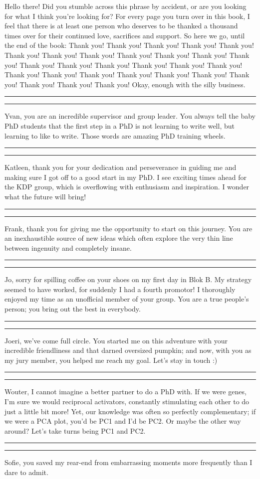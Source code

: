 Hello there! Did you stumble across this phrase by accident, 
or are you looking for what I think you're looking for?
For every page you turn over in this book,
I feel that there is at least one person who deserves to be thanked 
a thousand times over for their continued love, sacrifices and support.
So here we go, until the end of the book: Thank you! Thank you!
Thank you! Thank you! Thank you! Thank you! Thank you! Thank you! 
Thank you! Thank you! Thank you! Thank you! Thank you! Thank you!
Thank you! Thank you! Thank you! Thank you! Thank you! Thank you!
Thank you! Thank you! Thank you! Thank you! Thank you! Thank you!
Thank you! Thank you! Okay, enough with the silly business.
\rule{10cm}{0.4pt}
\rule{10cm}{0.4pt}
Yvan, you are an incredible supervisor and group leader. 
You always tell the baby PhD students that the first step in a PhD
is not learning to write well, but learning to like to write.
Those words are amazing PhD training wheels.
\rule{10cm}{0.4pt}
\rule{10cm}{0.4pt}
Katleen, thank you for your dedication and perseverance
in guiding me and making sure I got off to a good start in my PhD.
I see exciting times ahead for the KDP group, which is overflowing
with enthusiasm and inspiration. I wonder what the future will bring!
\rule{10cm}{0.4pt}
\rule{10cm}{0.4pt}
Frank, thank you for giving me the opportunity to start on this journey.
You are an inexhaustible source of new ideas
which often explore the very thin line
between ingenuity and completely insane.
\rule{10cm}{0.4pt}
\rule{10cm}{0.4pt}
Jo, sorry for spilling coffee on your shoes on my first day in Blok B.
My strategy seemed to have worked, for suddenly I had a fourth promotor!
I thoroughly enjoyed my time as an unofficial member of your group.
You are a true people's person; you bring out the best in everybody.
\rule{10cm}{0.4pt}
\rule{10cm}{0.4pt}
Joeri, we've come full circle. You started me on this adventure
with your incredible friendliness and that darned oversized pumpkin;
and now, with you as my jury member, you helped me reach my goal.
Let's stay in touch :)
\rule{10cm}{0.4pt}
\rule{10cm}{0.4pt}
Wouter, I cannot imagine a better partner to do a PhD with.
If we were genes, I'm sure we would reciprocal activators,
constantly stimulating each other to do just a little bit more!
Yet, our knowledge was often so perfectly complementary;
if we were a PCA plot, you'd be PC1 and I'd be PC2.
Or maybe the other way around? Let's take turns being PC1 and PC2.
\rule{10cm}{0.4pt}
\rule{10cm}{0.4pt}
Sofie, you saved my rear-end from embarrassing moments more frequently than I dare to admit.
